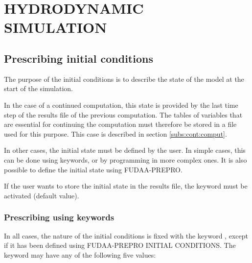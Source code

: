 

\chapter{  HYDRODYNAMIC SIMULATION}
\label{ch:hydrod:sim}

\section{Prescribing initial conditions}

 The purpose of the initial conditions is to describe the state of the model at the start of the simulation.

 In the case of a continued computation, this state is provided by the last time step of the results file of the previous computation. The tables of variables that are essential for continuing the computation must therefore be stored in a file used for this purpose. This case is described in section \ref{subs:cont:comput}.

 In other cases, the initial state must be defined by the user. In simple cases, this can be done using keywords, or by programming in more complex ones. It is also possible to define the initial state using FUDAA-PREPRO.

 If the user wants to store the initial state in the results file, the keyword  must be activated (default value).


\subsection{ Prescribing using keywords}

 In all cases, the nature of the initial conditions is fixed with the keyword , except if it has been defined using FUDAA-PREPRO INITIAL CONDITIONS. The keyword  may have any of the following five values:

